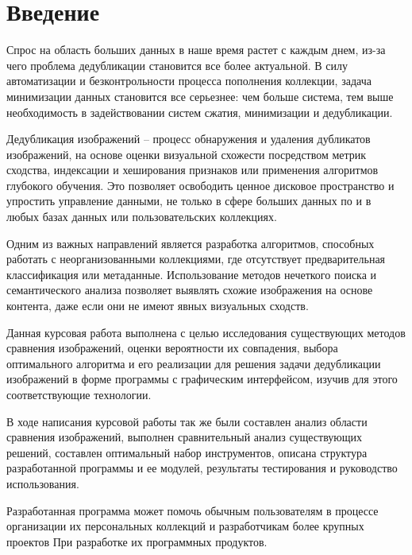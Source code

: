 \documentclass[variant=courcework]{bsuir}
\begin{document}
\maketitle



\tableofcontents

\chapter*{Введение}

Спрос на область больших данных в наше время растет с каждым днем, из-за чего
проблема дедубликации становится все более актуальной. В силу автоматизации и
безконтрольности процесса пополнения коллекции, задача минимизации данных
становится все серьезнее: чем больше система, тем выше необходимость в
задействовании систем сжатия, минимизации и дедубликации.

Дедубликация изображений -- процесс обнаружения и удаления дубликатов
изображений, на основе оценки визуальной схожести посредством метрик сходства,
индексации и хеширования признаков или применения алгоритмов глубокого обучения.
Это позволяет освободить ценное дисковое пространство и упростить управление
данными, не только в сфере больших данных по и в любых базах данных или
пользовательских коллекциях.

Одним из важных направлений является разработка алгоритмов, способных работать с
неорганизованными коллекциями, где отсутствует предварительная классификация или
метаданные. Использование методов нечеткого поиска и семантического анализа
позволяет выявлять схожие изображения на основе контента, даже если они не имеют
явных визуальных сходств.

Данная курсовая работа выполнена с целью исследования существующих методов
сравнения изображений, оценки вероятности их совпадения, выбора оптимального
алгоритма и его реализации для решения задачи дедубликации изображений в форме
программы с графическим интерфейсом, изучив для этого соответствующие
технологии.

В ходе написания курсовой работы так же были составлен анализ области сравнения
изображений, выполнен сравнительный анализ существующих решений, составлен
оптимальный набор инструментов, описана структура разработанной программы и ее
модулей, результаты тестирования и руководство использования.

Разработанная программа может помочь обычным пользователям в процессе
организации их персональных коллекций и разработчикам более крупных проектов При
разработке их программных продуктов.
\end{document}

